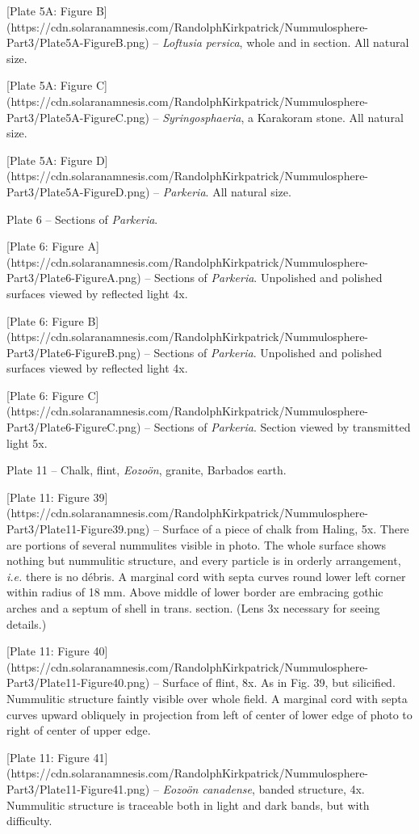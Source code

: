 \documentclass[a4paper, 12pt, oneside]{article}
\begin{document}
[Plate 5A: Figure B](https://cdn.solaranamnesis.com/RandolphKirkpatrick/Nummulosphere-Part3/Plate5A-FigureB.png) -- \emph{Loftusia persica}, whole and in section. All natural size.

[Plate 5A: Figure C](https://cdn.solaranamnesis.com/RandolphKirkpatrick/Nummulosphere-Part3/Plate5A-FigureC.png) -- \emph{Syringosphaeria}, a Karakoram stone. All natural size.

[Plate 5A: Figure D](https://cdn.solaranamnesis.com/RandolphKirkpatrick/Nummulosphere-Part3/Plate5A-FigureD.png) -- \emph{Parkeria}. All natural size.

Plate 6 -- Sections of \emph{Parkeria}.

[Plate 6: Figure A](https://cdn.solaranamnesis.com/RandolphKirkpatrick/Nummulosphere-Part3/Plate6-FigureA.png) -- Sections of \emph{Parkeria}. Unpolished and polished surfaces viewed by reflected light 4x.

[Plate 6: Figure B](https://cdn.solaranamnesis.com/RandolphKirkpatrick/Nummulosphere-Part3/Plate6-FigureB.png) -- Sections of \emph{Parkeria}. Unpolished and polished surfaces viewed by reflected light 4x.

[Plate 6: Figure C](https://cdn.solaranamnesis.com/RandolphKirkpatrick/Nummulosphere-Part3/Plate6-FigureC.png) -- Sections of \emph{Parkeria}. Section viewed by transmitted light 5x.

Plate 11 -- Chalk, flint, \emph{Eozoön}, granite, Barbados earth.

[Plate 11: Figure 39](https://cdn.solaranamnesis.com/RandolphKirkpatrick/Nummulosphere-Part3/Plate11-Figure39.png) -- Surface of a piece of chalk from Haling, 5x. There are portions of several nummulites visible in photo. The whole surface shows nothing but nummulitic structure, and every particle is in orderly arrangement, \emph{i.e.} there is no débris. A marginal cord with septa curves round lower left corner within radius of 18 mm. Above middle of lower border are embracing gothic arches and a septum of shell in trans. section. (Lens 3x necessary for seeing details.)

[Plate 11: Figure 40](https://cdn.solaranamnesis.com/RandolphKirkpatrick/Nummulosphere-Part3/Plate11-Figure40.png) -- Surface of flint, 8x. As in Fig. 39, but silicified. Nummulitic structure faintly visible over whole field. A marginal cord with septa curves upward obliquely in projection from left of center of lower edge of photo to right of center of upper edge.

[Plate 11: Figure 41](https://cdn.solaranamnesis.com/RandolphKirkpatrick/Nummulosphere-Part3/Plate11-Figure41.png) -- \emph{Eozoön canadense}, banded structure, 4x. Nummulitic structure is traceable both in light and dark bands, but with difficulty.
\end{document}
